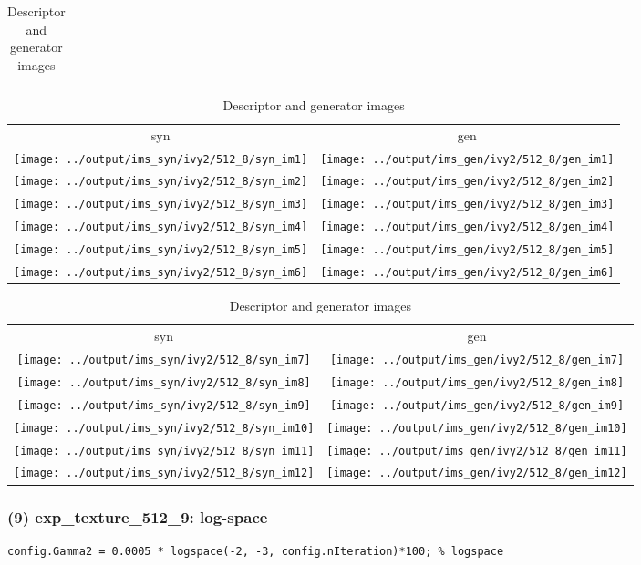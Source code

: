 \documentclass[letter]{article}
\begin{document}
\begin{table}[h!]
\begin{tabular}{c}
	\end{tabular}
	\begin{tabular}{cc}
		syn & gen\tabularnewline
		\texttt{[image: ../output/ims\_syn/ivy2/512\_8/syn\_im1]} & \texttt{[image: ../output/ims\_gen/ivy2/512\_8/gen\_im1]} \tabularnewline
		\texttt{[image: ../output/ims\_syn/ivy2/512\_8/syn\_im2]} & \texttt{[image: ../output/ims\_gen/ivy2/512\_8/gen\_im2]} \tabularnewline
		\texttt{[image: ../output/ims\_syn/ivy2/512\_8/syn\_im3]} & \texttt{[image: ../output/ims\_gen/ivy2/512\_8/gen\_im3]} \tabularnewline
		\texttt{[image: ../output/ims\_syn/ivy2/512\_8/syn\_im4]} & \texttt{[image: ../output/ims\_gen/ivy2/512\_8/gen\_im4]} \tabularnewline
		\texttt{[image: ../output/ims\_syn/ivy2/512\_8/syn\_im5]} & \texttt{[image: ../output/ims\_gen/ivy2/512\_8/gen\_im5]} \tabularnewline
		\texttt{[image: ../output/ims\_syn/ivy2/512\_8/syn\_im6]} & \texttt{[image: ../output/ims\_gen/ivy2/512\_8/gen\_im6]} \tabularnewline
	\end{tabular}
	\begin{tabular}{cc}
		syn & gen\tabularnewline
		\texttt{[image: ../output/ims\_syn/ivy2/512\_8/syn\_im7]} & \texttt{[image: ../output/ims\_gen/ivy2/512\_8/gen\_im7]} \tabularnewline
		\texttt{[image: ../output/ims\_syn/ivy2/512\_8/syn\_im8]} & \texttt{[image: ../output/ims\_gen/ivy2/512\_8/gen\_im8]} \tabularnewline
		\texttt{[image: ../output/ims\_syn/ivy2/512\_8/syn\_im9]} & \texttt{[image: ../output/ims\_gen/ivy2/512\_8/gen\_im9]} \tabularnewline
		\texttt{[image: ../output/ims\_syn/ivy2/512\_8/syn\_im10]} & \texttt{[image: ../output/ims\_gen/ivy2/512\_8/gen\_im10]} \tabularnewline
		\texttt{[image: ../output/ims\_syn/ivy2/512\_8/syn\_im11]} & \texttt{[image: ../output/ims\_gen/ivy2/512\_8/gen\_im11]} \tabularnewline
		\texttt{[image: ../output/ims\_syn/ivy2/512\_8/syn\_im12]} & \texttt{[image: ../output/ims\_gen/ivy2/512\_8/gen\_im12]} \tabularnewline
	\end{tabular}
	\caption{Descriptor and generator images}
\end{table}
\newpage

\subsubsection*{(9) exp\_texture\_512\_9: log-space}

\begin{lstlisting}
config.Gamma2 = 0.0005 * logspace(-2, -3, config.nIteration)*100; % logspace
\end{lstlisting}
\end{document}
